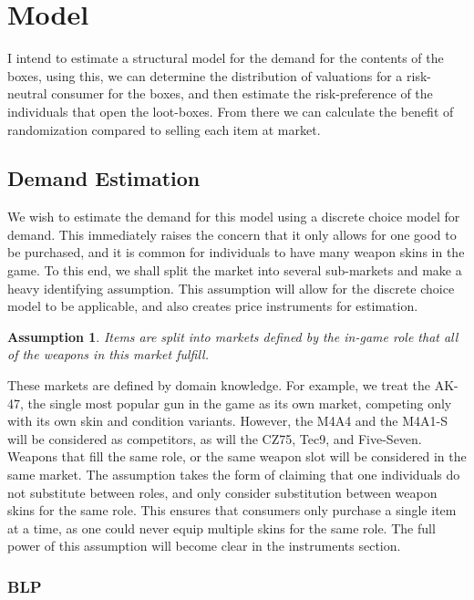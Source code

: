 \documentclass[12pt]{paper}
\newtheorem{assume}{Assumption}
\begin{document}
\section{Model}

I intend to estimate a structural model for the demand for the
contents of the boxes, using this, we can determine the distribution
of valuations for a risk-neutral consumer for the boxes, and then
estimate the risk-preference of the individuals that open the
loot-boxes. From there we can calculate the benefit of randomization
compared to selling each item at market.

\subsection{Demand Estimation}

We wish to estimate the demand for this model using a discrete choice
model for demand. This immediately raises the concern that it only
allows for one good to be purchased, and it is common for individuals
to have many weapon skins in the game. To this end, we shall split the
market into several sub-markets and make a heavy identifying
assumption. This assumption will allow for the discrete choice model
to be applicable, and also creates price instruments for estimation.

\begin{assume}
  Items are split into markets defined by the in-game role that all of
  the weapons in this market fulfill.
\end{assume}

These markets are defined by domain knowledge. For example, we treat
the AK-47, the single most popular gun in the game as its own market,
competing only with its own skin and condition variants. However, the
M4A4 and the M4A1-S will be considered as competitors, as will the
CZ75, Tec9, and Five-Seven. Weapons that fill the same role, or the
same weapon slot will be considered in the same market. The assumption
takes the form of claiming that one individuals do not substitute
between roles, and only consider substitution between weapon skins for
the same role. This ensures that consumers only purchase a single item
at a time, as one could never equip multiple skins for the same
role. The full power of this assumption will become clear in the
instruments section.

\subsubsection{BLP}
\end{document}
